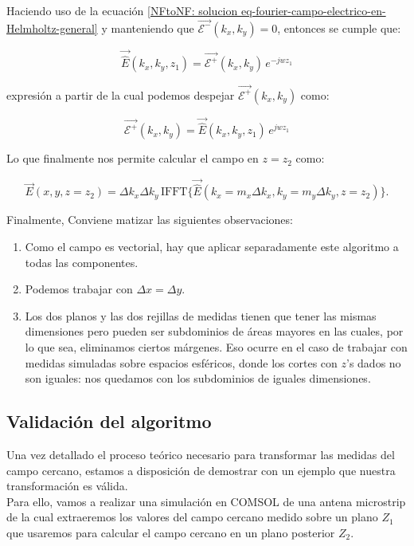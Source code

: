 Haciendo uso de la ecuación \eqref{NFtoNF: solucion eq-fourier-campo-electrico-en-Helmholtz-general} y manteniendo que $\vec{\mathcal{E}^{-}}(k_{x},k_{y})=0$, entonces se cumple que:

\begin{equation}
\vec{\hat{E}}(k_{x},k_{y},z_{1})=\vec{\mathcal{E}^{+}}(k_{x},k_{y})\,e^{-j
w z_{1}}
\end{equation}

\noindent
expresión a partir de la cual podemos despejar $\vec{\mathcal{E}^{+}}(k_{x},k_{y})$ como:

\begin{equation}
\vec{\mathcal{E}^{+}}(k_{x},k_{y})=\vec{\hat{E}}(k_{x},k_{y},z_{1})\,e^{j
w z_{1}}
\label{NFtoNF:Ez2-cambio-fase}
\end{equation}

Lo que finalmente nos permite calcular el campo en $z=z_2$ como:

\begin{equation}
\vec{E}(x,y,z=z_{2})=\Delta k_{x} \Delta
k_{y}\,\mbox{IFFT}\{\vec{\hat{E}}(k_{x}=m_{x}\Delta
k_{x},k_{y}=m_{y} \Delta k_{y},z=z_{2})\}.
\label{NFtoNF:Ez2-final}
\end{equation}

\newpage

Finalmente, Conviene matizar las siguientes observaciones:
\begin{enumerate}
    \item Como el campo es vectorial, hay que aplicar separadamente este
    algoritmo a todas las componentes.
    \item Podemos trabajar con $\Delta x=\Delta y$.
    \item Los dos planos y las dos rejillas de medidas tienen que tener las mismas
    dimensiones pero pueden ser subdominios de áreas mayores en las
    cuales, por lo que sea, eliminamos ciertos márgenes. Eso ocurre en
    el caso de trabajar con medidas simuladas sobre espacios esféricos,
    donde los cortes con $z$'s dados no son iguales: nos quedamos con
    los subdominios de iguales dimensiones.
\end{enumerate}

\newpage
\subsection{Validación del algoritmo}

Una vez detallado el proceso teórico necesario para transformar las medidas del campo cercano, estamos a disposición de demostrar con un ejemplo que nuestra transformación es válida.\\
Para ello, vamos a realizar una simulación en COMSOL de una antena microstrip de la cual extraeremos los valores del campo cercano medido sobre un plano $Z_1$ que usaremos para calcular el campo cercano en un plano posterior $Z_2$.
\\

